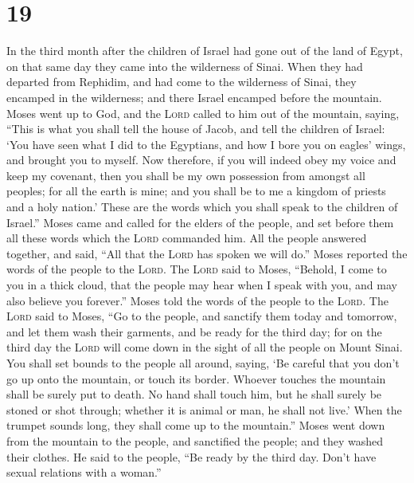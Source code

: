 \hypertarget{section-18}{%
\section{19}\label{section-18}}

 In the third month after the children of Israel had gone
out of the land of Egypt, on that same day they came into the wilderness
of Sinai.  When they had departed from Rephidim, and had
come to the wilderness of Sinai, they encamped in the wilderness; and
there Israel encamped before the mountain.  Moses went up
to God, and the \textsc{Lord} called to him out of the mountain, saying,
``This is what you shall tell the house of Jacob, and tell the children
of Israel:  `You have seen what I did to the Egyptians,
and how I bore you on eagles' wings, and brought you to myself.
 Now therefore, if you will indeed obey my voice and keep
my covenant, then you shall be my own possession from amongst all
peoples; for all the earth is mine;  and you shall be to
me a kingdom of priests and a holy nation.' These are the words which
you shall speak to the children of Israel.''  Moses came
and called for the elders of the people, and set before them all these
words which the \textsc{Lord} commanded him.  All the
people answered together, and said, ``All that the \textsc{Lord} has
spoken we will do.'' Moses reported the words of the people to the
\textsc{Lord}.  The \textsc{Lord} said to Moses, ``Behold,
I come to you in a thick cloud, that the people may hear when I speak
with you, and may also believe you forever.'' Moses told the words of
the people to the \textsc{Lord}.  The \textsc{Lord} said
to Moses, ``Go to the people, and sanctify them today and tomorrow, and
let them wash their garments,  and be ready for the third
day; for on the third day the \textsc{Lord} will come down in the sight
of all the people on Mount Sinai.  You shall set bounds
to the people all around, saying, `Be careful that you don't go up onto
the mountain, or touch its border. Whoever touches the mountain shall be
surely put to death.  No hand shall touch him, but he
shall surely be stoned or shot through; whether it is animal or man, he
shall not live.' When the trumpet sounds long, they shall come up to the
mountain.''  Moses went down from the mountain to the
people, and sanctified the people; and they washed their clothes.
 He said to the people, ``Be ready by the third day.
Don't have sexual relations with a woman.''

